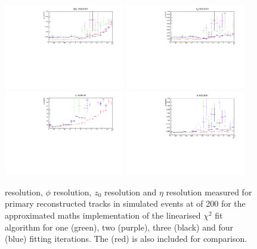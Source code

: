 \begin{figure}[htb]
\centering
\includegraphics[width=0.47\textwidth]{figs/tk-upgrade/results-chi2fitter/qOverPtResVsEta_IterationComparison.pdf}
\includegraphics[width=0.47\textwidth]{figs/tk-upgrade/results-chi2fitter/phi0ResVsEta_IterationComparison.pdf}
\\
\includegraphics[width=0.47\textwidth]{figs/tk-upgrade/results-chi2fitter/z0ResVsEta_IterationComparison.pdf}
\includegraphics[width=0.47\textwidth]{figs/tk-upgrade/results-chi2fitter/etaResVsEta_IterationComparison.pdf}
\caption{
\pt resolution, $\phi$ resolution, $z_{0}$ resolution and $\eta$ resolution measured for primary reconstructed tracks in simulated \ttbar events at \PU of 200 for the approximated maths implementation of the linearised $\chi^{2}$ fit algorithm for one (green), two (purple), three (black) and four (blue) fitting iterations. The \KF (red) is also included for comparison.
}
\label{fig:chi2HelixParametersResIterationsComparison}
\end{figure}

